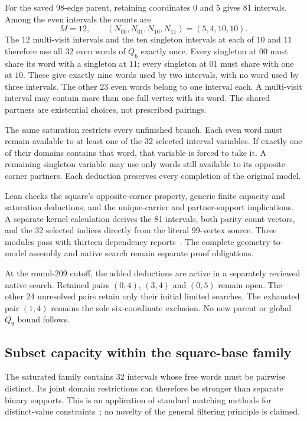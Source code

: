 \documentclass[11pt,a4paper]{article}
\theoremstyle{definition}
\theoremstyle{remark}
\begin{document}
For the saved 98-edge parent, retaining coordinates 0 and 5 gives
81 intervals. Among the even intervals the counts are
\[
M=12,\qquad (N_{00},N_{01},N_{10},N_{11})=(5,4,10,10).
\]
The 12 multi-visit intervals and the ten singleton intervals at each
of $10$ and $11$ therefore use all 32 even words of $Q_6$ exactly once.
Every singleton at $00$ must share its word with a singleton at $11$;
every singleton at $01$ must share with one at $10$. These give exactly
nine words used by two intervals, with no word used by three intervals.
The other 23 even words belong to one interval each. A multi-visit
interval may contain more than one full vertex with its word.
The shared partners are existential choices, not prescribed pairings.

The same saturation restricts every unfinished branch. Each even word
must remain available to at least one of the 32 selected interval
variables. If exactly one of their domains contains that word, that
variable is forced to take it. A remaining singleton variable may use
only words still available to its opposite-corner partners. Each
deduction preserves every completion of the original model.

Lean checks the square's opposite-corner property, generic finite
capacity and saturation deductions, and the unique-carrier and
partner-support implications. A separate kernel calculation derives
the 81 intervals, both parity count vectors, and the 32 selected
indices directly from the literal 99-vertex source. Three modules
pass with thirteen dependency reports~\cite{research209}. The complete
geometry-to-model assembly and native search remain separate proof
obligations.

At the round-209 cutoff, the added deductions are active in a separately
reviewed native search. Retained pairs $(0,4)$, $(3,4)$ and $(0,5)$ remain
open. The other 24 unresolved pairs retain only their initial limited
searches. The exhausted pair $(1,4)$ remains the sole six-coordinate
exclusion. No new parent or global $Q_9$ bound follows.


\subsection{Subset capacity within the square-base family}
\label{sec:subset211}
The saturated family contains 32 intervals whose free words must be
pairwise distinct. Its joint domain restrictions can therefore be stronger
than separate binary supports. This is an application of standard matching
methods for distinct-value constraints~\cite{regin1994}; no novelty of the
general filtering principle is claimed.
\end{document}
